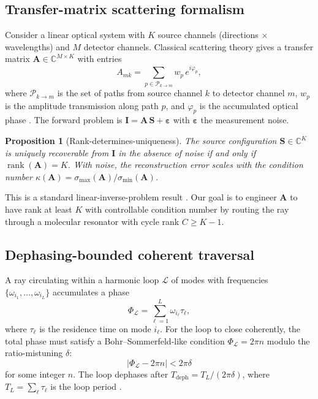 \documentclass[11pt,twocolumn,a4paper]{article}
\newtheorem{proposition}[theorem]{Proposition}
\theoremstyle{definition}
\theoremstyle{remark}
\newcommand{\Cmat}{\mathbf{A}}
\newcommand{\Ivec}{\mathbf{I}}
\newcommand{\Svec}{\mathbf{S}}
\newcommand{\Loop}{\mathcal{L}}
\newcommand{\rank}{\operatorname{rank}}
\begin{document}
\subsection{Transfer-matrix scattering formalism}

Consider a linear optical system with $K$ source channels (directions $\times$ wavelengths) and $M$ detector channels. Classical scattering theory gives a transfer matrix $\Cmat \in \mathbb{C}^{M \times K}$ with entries
\begin{equation}
\label{eq:transfer_matrix}
A_{mk} = \sum_{p \in \mathcal{P}_{k \to m}} w_p \, e^{i\varphi_p},
\end{equation}
where $\mathcal{P}_{k \to m}$ is the set of paths from source channel $k$ to detector channel $m$, $w_p$ is the amplitude transmission along path $p$, and $\varphi_p$ is the accumulated optical phase \citep{born1999,newton1982}. The forward problem is $\Ivec = \Cmat\,\Svec + \boldsymbol{\varepsilon}$ with $\boldsymbol{\varepsilon}$ the measurement noise.

\begin{proposition}[Rank-determines-uniqueness]
\label{prop:rank_uniqueness}
The source configuration $\Svec \in \mathbb{C}^K$ is uniquely recoverable from $\Ivec$ in the absence of noise if and only if $\rank(\Cmat) = K$. With noise, the reconstruction error scales with the condition number $\kappa(\Cmat) = \sigma_{\max}(\Cmat)/\sigma_{\min}(\Cmat)$.
\end{proposition}

This is a standard linear-inverse-problem result \citep{tarantola2005}. Our goal is to engineer $\Cmat$ to have rank at least $K$ with controllable condition number by routing the ray through a molecular resonator with cycle rank $C \geq K - 1$.

\subsection{Dephasing-bounded coherent traversal}

A ray circulating within a harmonic loop $\Loop$ of modes with frequencies $\{\omega_{i_1}, \ldots, \omega_{i_L}\}$ accumulates a phase
\begin{equation}
\Phi_\Loop = \sum_{\ell=1}^{L} \omega_{i_\ell} \tau_\ell,
\end{equation}
where $\tau_\ell$ is the residence time on mode $i_\ell$. For the loop to close coherently, the total phase must satisfy a Bohr--Sommerfeld-like condition $\Phi_\Loop = 2\pi n$ modulo the ratio-mistuning $\delta$:
\begin{equation}
\left|\Phi_\Loop - 2\pi n\right| < 2\pi \delta
\end{equation}
for some integer $n$. The loop dephases after $T_{\mathrm{deph}} = T_L / (2\pi\delta)$, where $T_L = \sum_\ell \tau_\ell$ is the loop period \citep{breuer2002}.
\end{document}
